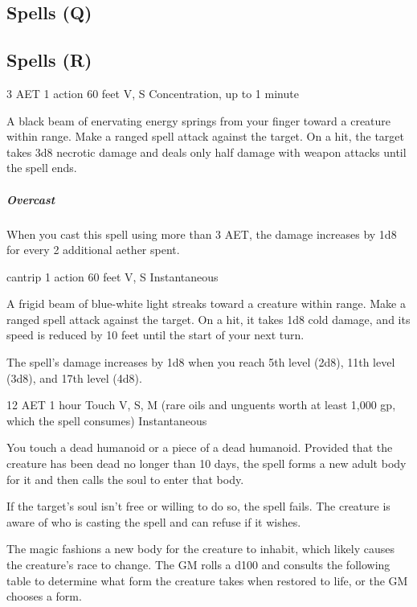 \subsection{Spells (Q)}

\subsection{Spells (R)}

{3 AET}
{1 action}
{60 feet}
{V, S}
{Concentration, up to 1 minute}

A black beam of enervating energy springs from your finger toward a creature within range. Make a ranged spell attack against the target. On a hit, the target takes 3d8 necrotic damage and deals only half damage with weapon attacks until the spell ends.

\subparagraph*{Overcast} When you cast this spell using more than 3 AET, the damage increases by 1d8 for every 2 additional aether spent.


{cantrip}
{1 action}
{60 feet}
{V, S}
{Instantaneous}

A frigid beam of blue-white light streaks toward a creature within range. Make a ranged spell attack against the target. On a hit, it takes 1d8 cold damage, and its speed is reduced by 10 feet until the start of your next turn.

The spell's damage increases by 1d8 when you reach 5th level (2d8), 11th level (3d8), and 17th level (4d8).


{12 AET}
{1 hour}
{Touch}
{V, S, M (rare oils and unguents worth at least 1,000 gp, which the spell consumes)}
{Instantaneous}

You touch a dead humanoid or a piece of a dead humanoid. Provided that the creature has been dead no longer than 10 days, the spell forms a new adult body for it and then calls the soul to enter that body.

If the target's soul isn't free or willing to do so, the spell fails. The creature is aware of who is casting the spell and can refuse if it wishes.

The magic fashions a new body for the creature to inhabit, which likely causes the creature's race to change. The GM rolls a d100 and consults the following table to determine what form the creature takes when restored to life, or the GM chooses a form.

